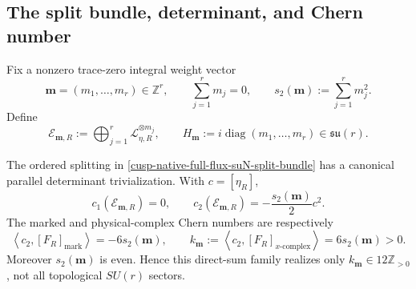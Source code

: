\subsection{The split bundle, determinant, and Chern number}

Fix a nonzero trace-zero integral weight vector
\begin{equation}
 \mathbf m=(m_1,\ldots,m_r)\in\mathbb Z^r,
 \qquad \sum_{j=1}^r m_j=0,
 \qquad s_2(\mathbf m):=\sum_{j=1}^r m_j^2.
 \label{cusp-native-full-flux-suN-weight-vector}
\end{equation}
Define
\begin{equation}
 \mathscr E_{\mathbf m,R}:=
 \bigoplus_{j=1}^r\mathscr L_{\eta,R}^{\otimes m_j},
 \qquad
 H_{\mathbf m}:=i\operatorname{diag}(m_1,\ldots,m_r)
 \in\mathfrak{su}(r).
 \label{cusp-native-full-flux-suN-split-bundle}
\end{equation}

\begin{proposition}
\label{cusp-native-full-flux-suN-topology}
The ordered splitting in
\cref{cusp-native-full-flux-suN-split-bundle} has a canonical parallel
determinant trivialization.  With \(c=[\eta_R]\),
\begin{equation}
 c_1(\mathscr E_{\mathbf m,R})=0,
 \qquad
 c_2(\mathscr E_{\mathbf m,R})
 =-\frac{s_2(\mathbf m)}2c^2.
 \label{cusp-native-full-flux-suN-Chern-classes}
\end{equation}
The marked and physical-complex Chern numbers are respectively
\begin{equation}
 \left\langle c_2,[F_R]_{\mathrm{mark}}\right\rangle=-6s_2(\mathbf m),
 \qquad
 k_{\mathbf m}:=
 \left\langle c_2,[F_R]_{x\text{-}\mathrm{complex}}\right\rangle
 =6s_2(\mathbf m)>0.
 \label{cusp-native-full-flux-suN-Chern-numbers}
\end{equation}
Moreover \(s_2(\mathbf m)\) is even.  Hence this direct-sum family realizes
only \(k_{\mathbf m}\in12\mathbb Z_{>0}\), not all topological \(SU(r)\)
sectors.
\end{proposition}

